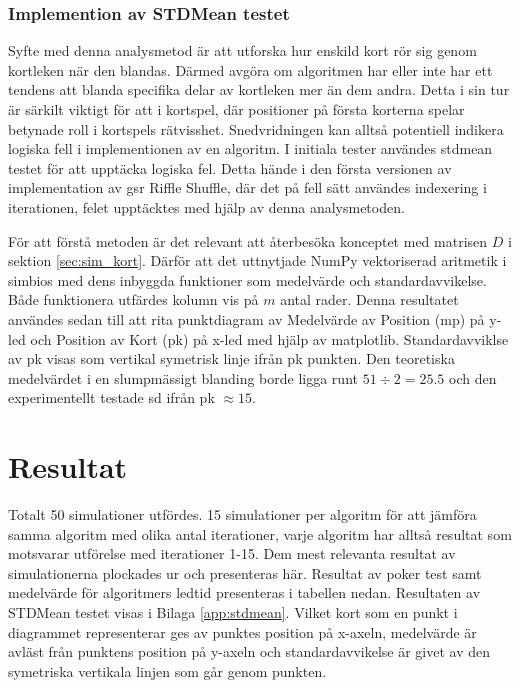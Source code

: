 \documentclass[swedish,a4paper]{article}
\begin{document}
\subsubsection{Implemention av STDMean testet}
Syfte med denna analysmetod är att utforska hur enskild kort rör sig genom
kortleken när den blandas. Därmed avgöra om algoritmen har eller inte har ett
tendens att blanda specifika delar av kortleken mer än dem andra. Detta i sin
tur är särkilt viktigt för att i kortspel, där positioner på första korterna
spelar betynade roll i kortspels rätvisshet. Snedvridningen kan alltså
potentiell indikera logiska fell i implementionen av en algoritm. I initiala
tester användes \gls{stdmean} testet för att upptäcka logiska fel. Detta hände i
den första versionen av implementation av \gls{gsr} Riffle Shuffle, där det på
fell sätt användes indexering i iterationen, felet upptäcktes med hjälp av denna
analysmetoden. 

För att förstå metoden är det relevant att återbesöka konceptet med matrisen $D$
i sektion \ref{sec:sim_kort}. Därför att det uttnytjade NumPy vektoriserad
aritmetik i simbios med dens inbyggda funktioner som medelvärde och
standardavvikelse. Både funktionera utfärdes kolumn vis på $m$ antal rader.
Denna resultatet användes sedan till att rita punktdiagram av Medelvärde av
Position (\gls{mp}) på y-led  och Position av Kort (\gls{pk}) på x-led med hjälp
av matplotlib. Standardavviklse av \gls{pk} visas som vertikal symetrisk linje
ifrån \gls{pk} punkten. Den teoretiska medelvärdet i en slumpmässigt blanding
borde ligga runt $51 \div 2 = 25.5$ och den experimentellt testade \gls{sd}
ifrån \gls{pk} $\approx 15$.

\section{Resultat}


Totalt 50 simulationer utfördes. 15 simulationer per algoritm för att jämföra
samma algoritm med olika antal iterationer, varje algoritm har alltså resultat
som motsvarar utförelse med iterationer 1-15. Dem mest relevanta resultat av
simulationerna plockades ur och presenteras här. Resultat av poker test samt
medelvärde för algoritmers ledtid presenteras i tabellen nedan. Resultaten
av STDMean testet visas i Bilaga \ref{app:stdmean}. Vilket kort som en punkt i
diagrammet representerar ges av punktes position på x-axeln, medelvärde är
avläst från punktens position på y-axeln och standardavvikelse är givet av den
symetriska vertikala linjen som går genom punkten.
\end{document}

